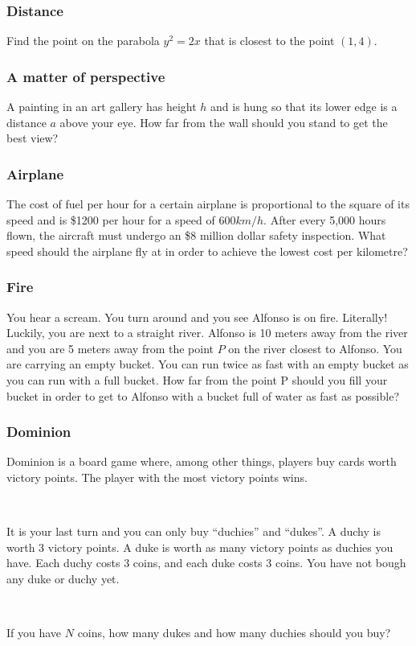 \documentclass[14pt]{beamer}
\begin{document}
\begin{frame}[t]
\frametitle{Distance}

Find the point on the parabola $y^2=2x$ that is closest to the point $(1,4)$.

\end{frame}
\begin{frame}[t]
\frametitle{A matter of perspective}


A painting in an art gallery has height $h$ and is hung  so that its lower edge is a distance $a$ above your eye.  How far from the wall should you stand to get the best view?

\end{frame}
\begin{frame}[t]
\frametitle{Airplane}

 The cost of fuel per hour for a certain airplane is proportional to the square of its speed and is \$1200 per hour for a speed of 600$km/h$.  After every 5,000 hours flown, the aircraft must undergo an \$8 million dollar safety inspection.  What speed should the airplane fly at in order to achieve the lowest cost per kilometre?
 
\end{frame} 
\begin{frame}[t]
\frametitle{Fire}

 You hear a scream.   You turn around and you see Alfonso is on fire.  Literally! Luckily, you are next to a straight river.
 Alfonso is 10 meters away from the river and you are 5 meters away from the point $P$ on the river closest to Alfonso.
You are carrying an empty bucket.  You can run twice as fast with an empty bucket as you can run with a full bucket.  How far from the point P should you fill your bucket in order to get to Alfonso with a bucket full of water as fast as possible?


\end{frame}
\begin{frame}[t]
\frametitle{Dominion}

Dominion is a board game where, among other things, players buy cards worth victory points.  The player with the most victory points wins.  

\

It is your last turn and you can only buy ``duchies'' and ``dukes''.  A duchy is worth 3 victory points.  A duke is worth as many victory points as duchies you have.  Each duchy costs 3 coins, and each duke costs 3 coins.   You have not bough any duke or duchy yet.  
 
\

 If you have $N$ coins, how many dukes and how many duchies should you buy?


\end{frame}
\end{document}
